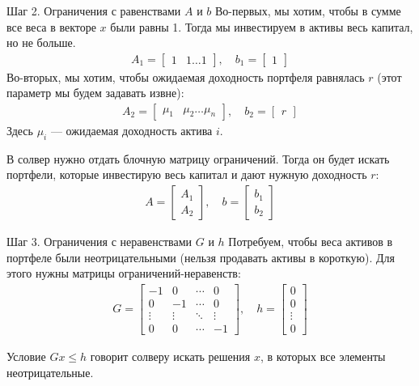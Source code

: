 \documentclass{beamer}
\begin{document}
\begin{frame}{Шаг 2. Ограничения с равенствами $A$ и $b$}
\justify
Во-первых, мы хотим, чтобы в сумме все веса в векторе $x$ были равны 1. Тогда мы инвестируем в активы весь капитал, но не больше.
\begin{align*}
A_1 = \begin{bmatrix}
1 & 1 \dots 1
\end{bmatrix},
\quad
b_1 = \begin{bmatrix}1\end{bmatrix}
\end{align*}
\justify
Во-вторых, мы хотим, чтобы ожидаемая доходность портфеля равнялась $r$ (этот параметр мы будем задавать извне):
\begin{align*}
A_2 = \begin{bmatrix}
\mu_1 & \mu_2 \dots \mu_n
\end{bmatrix},
\quad
b_2 = \begin{bmatrix}r\end{bmatrix}
\end{align*}
Здесь $\mu_i$ --- ожидаемая доходность актива $i$.

\justify
В солвер нужно отдать блочную матрицу ограничений. Тогда он будет искать портфели, которые инвестирую весь капитал и дают нужную доходность $r$:
\begin{align*}
A = \begin{bmatrix}A_1 \\ A_2\end{bmatrix}, \quad b = \begin{bmatrix}b_1 \\ b_2\end{bmatrix}
\end{align*} 
\end{frame}


\begin{frame}{Шаг 3. Ограничения с неравенствами $G$ и $h$}
\justify
Потребуем, чтобы веса активов в портфеле были неотрицательными (нельзя продавать активы в короткую). Для этого нужны матрицы ограничений-неравенств:
\begin{align*}
G =
\begin{bmatrix}
    -1 &      0 & \cdots & 0 \\
     0 &     -1 & \cdots & 0 \\
\vdots & \vdots & \ddots & \vdots \\
     0 &      0 & \cdots & -1
\end{bmatrix},
\quad
h = \begin{bmatrix}0 \\ 0 \\ \vdots \\ 0\end{bmatrix}
\end{align*}

\justify
Условие $Gx \le h$ говорит солверу искать решения $x$, в которых все элементы неотрицательные.
\end{frame}
\end{document}
